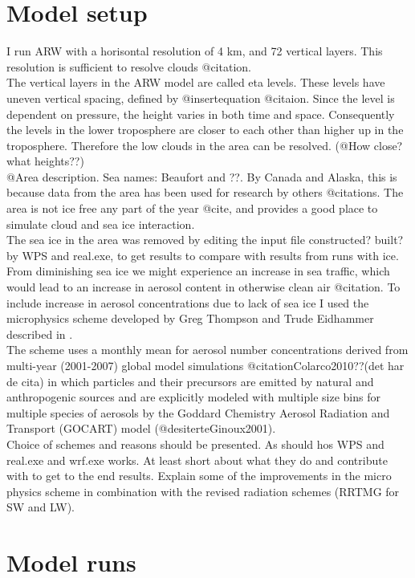 \section{Model setup}
\label{sec:modelset}
I run ARW with a horisontal resolution of 4 km, and 72 vertical layers. This resolution is sufficient to resolve clouds @citation.
\\
The vertical layers in the ARW model are called eta levels. These levels have uneven vertical spacing, defined by @insertequation @citaion. Since the level is dependent on pressure, the height varies in both time and space. Consequently the levels in the lower troposphere are closer to each other than higher up in the troposphere. Therefore the low clouds in the area can be resolved. (@How close? what heights??)
\\
@Area description. Sea names: Beaufort and ??. By Canada and Alaska, this is because data from the area has been used for research by others @citations. The area is not ice free any part of the year @cite, and provides a good place to simulate cloud and sea ice interaction.
\\
The sea ice in the area was removed by editing the input file constructed? built? by WPS and real.exe, to get results to compare with results from runs with ice.
\\
From diminishing sea ice we might experience an increase in sea traffic, which would lead to an increase in aerosol content in otherwise clean air @citation. To include increase in aerosol concentrations due to lack of sea ice I used the microphysics scheme developed by Greg Thompson and Trude Eidhammer described in \cite{Thompson2014}.
\\
The scheme uses a monthly mean for aerosol number concentrations derived from multi-year (2001-2007) global model simulations @citationColarco2010??(det har de cita) in which particles and their precursors are emitted by natural and anthropogenic sources and are explicitly modeled with multiple size bins for multiple species of aerosols by the Goddard Chemistry Aerosol Radiation and Transport (GOCART) model (@desiterteGinoux2001).
\\
Choice of schemes and reasons should be presented. As should hos WPS and real.exe and wrf.exe works. At least short about what they do and contribute with to get to the end results. Explain some of the improvements in the micro physics scheme in combination with the revised radiation schemes (RRTMG for SW and LW).

\section{Model runs}
